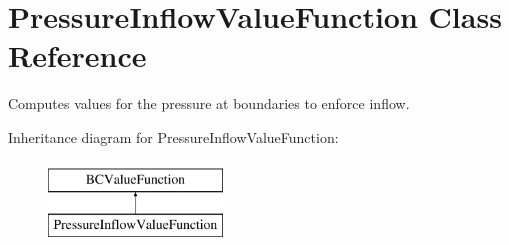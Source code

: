 \hypertarget{class_pressure_inflow_value_function}{}\section{Pressure\+Inflow\+Value\+Function Class Reference}
\label{class_pressure_inflow_value_function}


Computes values for the pressure at boundaries to enforce inflow.  


Inheritance diagram for Pressure\+Inflow\+Value\+Function\+:\begin{figure}[H]
\begin{center}
\leavevmode
\includegraphics[height=2.000000cm]{class_pressure_inflow_value_function}
\end{center}
\end{figure}

